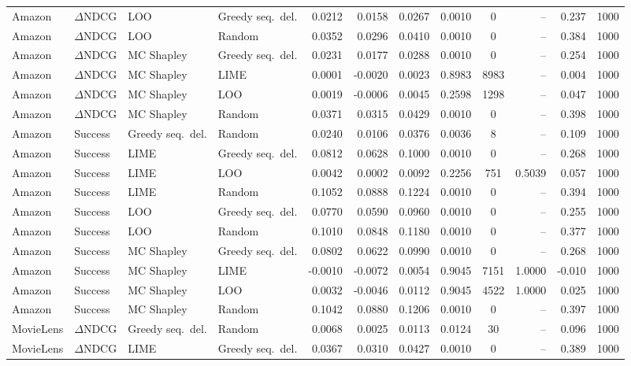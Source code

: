 \begin{longtable}{@{}p{}p{}p{}p{}rrrrcrrr@{}}
Amazon & $\Delta$NDCG & LOO & Greedy seq.\ del. & 0.0212 & 0.0158 & 0.0267 & 0.0010 & 0 & -- & 0.237 & 1000 \\
Amazon & $\Delta$NDCG & LOO & Random & 0.0352 & 0.0296 & 0.0410 & 0.0010 & 0 & -- & 0.384 & 1000 \\
Amazon & $\Delta$NDCG & MC Shapley & Greedy seq.\ del. & 0.0231 & 0.0177 & 0.0288 & 0.0010 & 0 & -- & 0.254 & 1000 \\
Amazon & $\Delta$NDCG & MC Shapley & LIME & 0.0001 & -0.0020 & 0.0023 & 0.8983 & 8983 & -- & 0.004 & 1000 \\
Amazon & $\Delta$NDCG & MC Shapley & LOO & 0.0019 & -0.0006 & 0.0045 & 0.2598 & 1298 & -- & 0.047 & 1000 \\
Amazon & $\Delta$NDCG & MC Shapley & Random & 0.0371 & 0.0315 & 0.0429 & 0.0010 & 0 & -- & 0.398 & 1000 \\
Amazon & Success & Greedy seq.\ del. & Random & 0.0240 & 0.0106 & 0.0376 & 0.0036 & 8 & -- & 0.109 & 1000 \\
Amazon & Success & LIME & Greedy seq.\ del. & 0.0812 & 0.0628 & 0.1000 & 0.0010 & 0 & -- & 0.268 & 1000 \\
Amazon & Success & LIME & LOO & 0.0042 & 0.0002 & 0.0092 & 0.2256 & 751 & 0.5039 & 0.057 & 1000 \\
Amazon & Success & LIME & Random & 0.1052 & 0.0888 & 0.1224 & 0.0010 & 0 & -- & 0.394 & 1000 \\
Amazon & Success & LOO & Greedy seq.\ del. & 0.0770 & 0.0590 & 0.0960 & 0.0010 & 0 & -- & 0.255 & 1000 \\
Amazon & Success & LOO & Random & 0.1010 & 0.0848 & 0.1180 & 0.0010 & 0 & -- & 0.377 & 1000 \\
Amazon & Success & MC Shapley & Greedy seq.\ del. & 0.0802 & 0.0622 & 0.0990 & 0.0010 & 0 & -- & 0.268 & 1000 \\
Amazon & Success & MC Shapley & LIME & -0.0010 & -0.0072 & 0.0054 & 0.9045 & 7151 & 1.0000 & -0.010 & 1000 \\
Amazon & Success & MC Shapley & LOO & 0.0032 & -0.0046 & 0.0112 & 0.9045 & 4522 & 1.0000 & 0.025 & 1000 \\
Amazon & Success & MC Shapley & Random & 0.1042 & 0.0880 & 0.1206 & 0.0010 & 0 & -- & 0.397 & 1000 \\
MovieLens & $\Delta$NDCG & Greedy seq.\ del. & Random & 0.0068 & 0.0025 & 0.0113 & 0.0124 & 30 & -- & 0.096 & 1000 \\
MovieLens & $\Delta$NDCG & LIME & Greedy seq.\ del. & 0.0367 & 0.0310 & 0.0427 & 0.0010 & 0 & -- & 0.389 & 1000 \\

\end{longtable}
